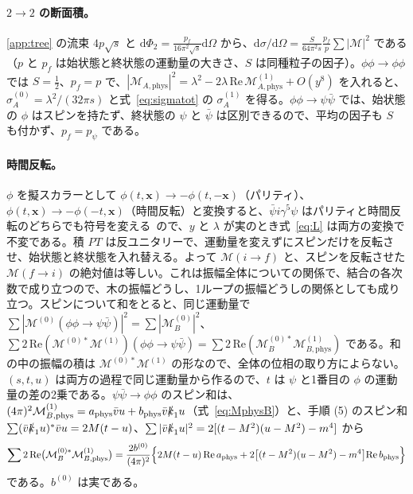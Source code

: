 \documentclass[a4paper,10pt]{ltjsarticle}
\newcommand{\dd}{\mathrm{d}}
\begin{document}
\paragraph{$2\to2$ の断面積。}\ref{app:tree} の流束 $4p\sqrt s$ と $\dd\Phi_2=\frac{p_f}{16\pi^2\sqrt s}\dd\Omega$ から、$\dd\sigma/\dd\Omega=\frac{S}{64\pi^2s}\frac{p_f}{p}\sum|\mathcal M|^2$ である（$p$ と $p_f$ は始状態と終状態の運動量の大きさ、$S$ は同種粒子の因子）。$\phi\phi\to\phi\phi$ では $S=\frac12$、$p_f=p$ で、$|\mathcal M_{A,\mathrm{phys}}|^2=\lambda^2-2\lambda\,\mathrm{Re}\,\mathcal M^{(1)}_{A,\mathrm{phys}}+O(y^8)$ を入れると、$\sigma_A^{(0)}=\lambda^2/(32\pi s)$ と式~\eqref{eq:sigmatot} の $\sigma_A^{(1)}$ を得る。$\phi\phi\to\psi\bar\psi$ では、始状態の $\phi$ はスピンを持たず、終状態の $\psi$ と $\bar\psi$ は区別できるので、平均の因子も $S$ も付かず、$p_f=p_\psi$ である。

\paragraph{時間反転。}$\phi$ を擬スカラーとして $\phi(t,\boldsymbol x)\to-\phi(t,-\boldsymbol x)$（パリティ）、$\phi(t,\boldsymbol x)\to-\phi(-t,\boldsymbol x)$（時間反転）と変換すると、$\bar\psi i\gamma^5\psi$ はパリティと時間反転のどちらでも符号を変える~\cite{Peskin}ので、$y$ と $\lambda$ が実のとき式~\eqref{eq:L} は両方の変換で不変である。積 $PT$ は反ユニタリーで、運動量を変えずにスピンだけを反転させ、始状態と終状態を入れ替える。よって $\mathcal M(i\to f)$ と、スピンを反転させた $\mathcal M(f\to i)$ の絶対値は等しい。これは振幅全体についての関係で、結合の各次数で成り立つので、木の振幅どうし、1ループの振幅どうしの関係としても成り立つ。スピンについて和をとると、同じ運動量で $\sum|\mathcal M^{(0)}(\phi\phi\to\psi\bar\psi)|^2=\sum|\mathcal M_B^{(0)}|^2$、$\sum2\,\mathrm{Re}(\mathcal M^{(0)*}\mathcal M^{(1)})(\phi\phi\to\psi\bar\psi)=\sum2\,\mathrm{Re}(\mathcal M_B^{(0)*}\mathcal M_{B,\mathrm{phys}}^{(1)})$ である。和の中の振幅の積は $\mathcal M^{(0)*}\mathcal M^{(1)}$ の形なので、全体の位相の取り方によらない。$(s,t,u)$ は両方の過程で同じ運動量から作るので、$t$ は $\psi$ と1番目の $\phi$ の運動量の差の2乗である。$\psi\bar\psi\to\phi\phi$ のスピン和は、$(4\pi)^2\mathcal M_{B,\mathrm{phys}}^{(1)}=a_{\mathrm{phys}}\bar vu+b_{\mathrm{phys}}\bar v\slashed k_1u$（式~\eqref{eq:MphysB}）と、手順 (5) のスピン和 $\sum(\bar v\slashed k_1u)^*\bar vu=2M(t-u)$、$\sum|\bar v\slashed k_1u|^2=2[(t-M^2)(u-M^2)-m^4]$ から
\begin{equation*}
\sum2\,\mathrm{Re}\bigl(\mathcal M_B^{(0)*}\mathcal M_{B,\mathrm{phys}}^{(1)}\bigr)=\frac{2b^{(0)}}{(4\pi)^2}\Bigl\{2M(t-u)\,\mathrm{Re}\,a_{\mathrm{phys}}+2\bigl[(t-M^2)(u-M^2)-m^4\bigr]\mathrm{Re}\,b_{\mathrm{phys}}\Bigr\}
\end{equation*}
である。$b^{(0)}$ は実である。
\end{document}
